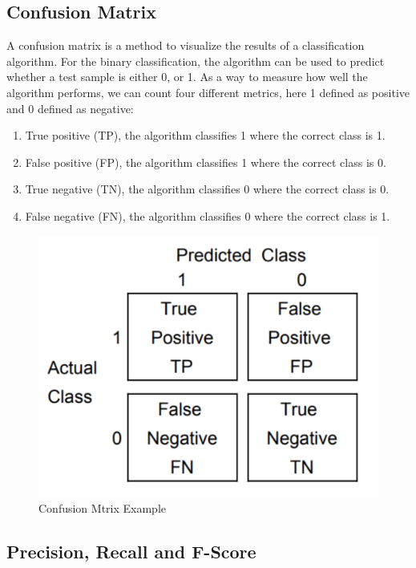 \subsection{Confusion Matrix}

A confusion matrix is a method to visualize the results of a classification algorithm. For the binary classification, the algorithm can be used to predict whether a test sample is either 0, or 1. As a way to measure how well the algorithm performs, we can count four different metrics, here 1 defined as positive and 0 defined as negative:

\begin{enumerate}

\item True positive (TP), the algorithm classifies 1 where the correct class is 1.
\item False positive (FP), the algorithm classifies 1 where the correct class is 0.
\item True negative (TN), the algorithm classifies 0 where the correct class is 0.
\item False negative (FN), the algorithm classifies 0 where the correct class is 1.

\end{enumerate}

\begin{figure}[hbtp]
\caption{Confusion Mtrix Example}
\includegraphics[scale=.5]{../Figures/Confuse_Mat_Example.png}\centering
\end{figure}

\subsection{Precision, Recall and F-Score}


